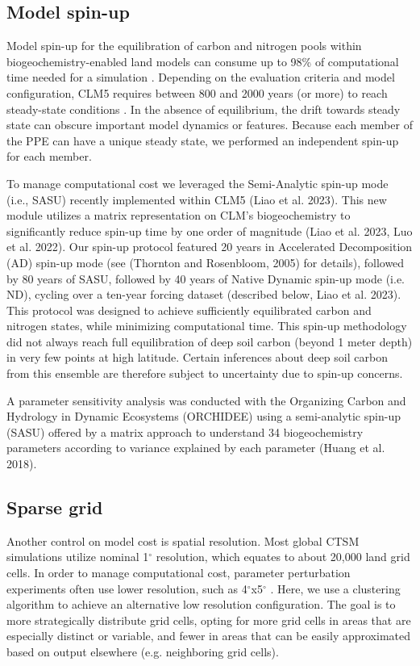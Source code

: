 \documentclass[draft]{agujournal2019}
\begin{document}
\subsection{Model spin-up}
\label{sect:mcn}
Model spin-up for the equilibration of carbon and nitrogen pools within biogeochemistry-enabled land models can consume up to 98\% of computational time needed for a simulation \cite{sun2023}. Depending on the evaluation criteria and model configuration, CLM5 requires between 800 and 2000 years (or more) to reach steady-state conditions \cite{lawrence2019}. In the absence of equilibrium, the drift towards steady state can obscure important model dynamics or features. Because each member of the PPE can have a unique steady state, we performed an independent spin-up for each member.

To manage computational cost we leveraged the Semi-Analytic spin-up mode (i.e., SASU) recently implemented within CLM5 \cite{lu2020} (Liao et al. 2023). This new module utilizes a matrix representation on CLM's biogeochemistry to significantly reduce spin-up time by one order of magnitude (Liao et al. 2023, Luo et al. 2022). Our spin-up protocol featured 20 years in Accelerated Decomposition (AD) spin-up mode (see  (Thornton and Rosenbloom, 2005) for details), followed by 80 years of SASU, followed by 40 years of Native Dynamic spin-up mode (i.e. ND), cycling over a ten-year forcing dataset (described below, Liao et al. 2023). This protocol was designed to achieve sufficiently equilibrated carbon and nitrogen states, while minimizing computational time. This spin-up methodology did not always reach full equilibration of deep soil carbon (beyond 1 meter depth) in very few points at high latitude. Certain inferences about deep soil carbon from this ensemble are therefore subject to uncertainty due to spin-up concerns.

 A parameter sensitivity analysis was conducted with the Organizing Carbon and Hydrology in Dynamic Ecosystems (ORCHIDEE) using a semi-analytic spin-up (SASU) offered by a matrix approach to understand 34 biogeochemistry parameters according to variance explained by each parameter (Huang et al. 2018).


\subsection{Sparse grid}
\label{sect:sg}
Another control on model cost is spatial resolution. Most global CTSM simulations utilize nominal 1$^\circ$ resolution, which equates to about 20,000 land grid cells. In order to manage computational cost, parameter perturbation experiments often use lower resolution, such as 4$^\circ$x5$^\circ$ \cite{dagon2020}. Here, we use a clustering algorithm to achieve an alternative low resolution configuration. The goal is to more strategically distribute grid cells, opting for more grid cells in areas that are especially distinct or variable, and fewer in areas that can be easily approximated based on output elsewhere (e.g. neighboring grid cells). 
\end{document}
